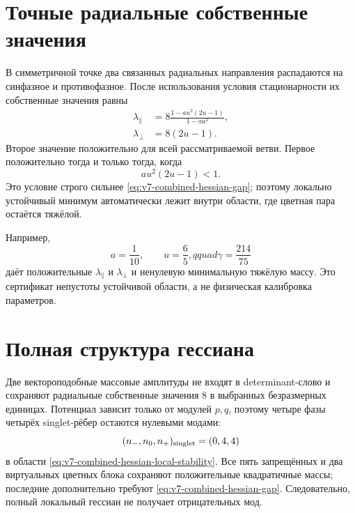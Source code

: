 \section{Точные радиальные собственные значения}

В симметричной точке два связанных радиальных направления распадаются на
синфазное и противофазное. После использования условия стационарности их
собственные значения равны
\begin{align}
 \lambda_{\parallel}
 &=8\frac{1-au^2(2u-1)}{1-au^2},
 \label{eq:v7-combined-hessian-radial-parallel}\\
 \lambda_{\perp}&=8(2u-1).
 \label{eq:v7-combined-hessian-radial-perpendicular}
\end{align}
Второе значение положительно для всей рассматриваемой ветви. Первое
положительно тогда и только тогда, когда
\begin{equation}
 \boxed{au^2(2u-1)<1.}
 \label{eq:v7-combined-hessian-local-stability}
\end{equation}
Это условие строго сильнее \eqref{eq:v7-combined-hessian-gap}; поэтому
локально устойчивый минимум автоматически лежит внутри области, где
цветная пара остаётся тяжёлой.

Например,
\begin{equation}
 a=\frac1{10},\qquad u=\frac65,qquad
 \gamma=\frac{214}{75}
 \label{eq:v7-combined-hessian-benchmark}
\end{equation}
даёт положительные $\lambda_{\parallel}$ и $\lambda_{\perp}$ и ненулевую
минимальную тяжёлую массу. Это сертификат непустоты устойчивой области, а
не физическая калибровка параметров.

\section{Полная структура гессиана}

Две вектороподобные массовые амплитуды не входят в determinant-слово и
сохраняют радиальные собственные значения $8$ в выбранных безразмерных
единицах. Потенциал зависит только от модулей $p,q$, поэтому четыре фазы
четырёх singlet-рёбер остаются нулевыми модами:
\begin{equation}
 (n_-,n_0,n_+)_{\rm singlet}=(0,4,4)
 \label{eq:v7-combined-hessian-singlet-signature}
\end{equation}
в области \eqref{eq:v7-combined-hessian-local-stability}. Все пять
запрещённых и два виртуальных цветных блока сохраняют положительные
квадратичные массы; последние дополнительно требуют
\eqref{eq:v7-combined-hessian-gap}. Следовательно, полный локальный
гессиан не получает отрицательных мод.

